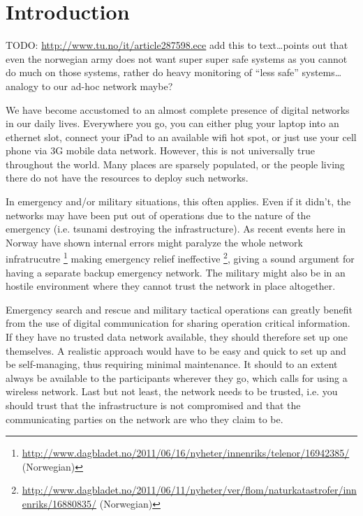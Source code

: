 \chapter{Introduction}
\label{ch:intro}
\acresetall

TODO: \url{http://www.tu.no/it/article287598.ece} add this to text\ldots points
out that even the norwegian army does not want super super safe systems as you
cannot do much on those systems, rather do heavy monitoring of ``less safe''
systems\ldots analogy to our ad-hoc network maybe?

We have become accustomed to an almost complete presence of digital networks
in our daily lives. Everywhere you go, you can either plug your laptop into an
ethernet slot, connect your iPad to an available wifi hot spot, or just use
your cell phone via 3G mobile data network. However, this is not universally
true throughout the world. Many places are sparsely populated, or the people
living there do not have the resources to deploy such networks.

In emergency and/or military situations, this often applies. Even if it didn't,
the networks may have been put out of operations due to the nature of the
emergency (i.e. tsunami destroying the infrastructure). As recent events
here in Norway have shown internal errors might paralyze the whole network 
infratrucutre
\footnote{\url{http://www.dagbladet.no/2011/06/16/nyheter/innenriks/telenor/16942385/}
(Norwegian)} making emergency relief ineffective
\footnote{\url{http://www.dagbladet.no/2011/06/11/nyheter/ver/flom/naturkatastrofer/innenriks/16880835/}
(Norwegian)}, giving a sound argument for having a separate backup emergency
network. The military might also be in an hostile environment where they cannot trust
the network in place altogether.

Emergency search and rescue and military tactical operations can greatly benefit
from the use of digital communication for sharing operation critical
information. If they have no trusted data network available, they should
therefore set up one themselves. A realistic approach would have to be easy and
quick to set up and be self-managing, thus requiring minimal maintenance. It
should to an extent always be available to the participants wherever they go,
which calls for using a wireless network. Last but not least, the network needs
to be trusted, i.e. you should trust that the infrastructure is not compromised
and that the communicating parties on the network are who they claim to be.

